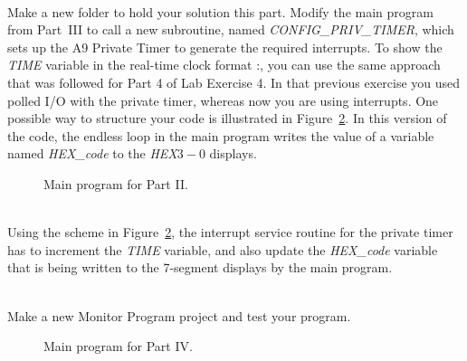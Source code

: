 \documentclass[epsfig,10pt,fullpage]{article}
\newcommand{\CommonDocsPath}{../../../../common/docs}
\begin{document}
~\\
\noindent
Make a new folder to hold your solution this part. Modify the main
program from Part~III to call a new subroutine, named {\it CONFIG\_PRIV\_TIMER}, which sets up the
A9 Private Timer to generate the required interrupts. To show the {\it TIME} variable in
the real-time clock format :, you can use the same approach that was
followed for Part 4 of Lab Exercise 4. In that previous exercise you used polled I/O with
the private timer, whereas now you are using interrupts. One possible way to structure
your code is illustrated in Figure~\ref{fig:code3}. In this version of the code, the 
endless loop in the main program writes the value of a variable named {\it HEX\_code} to 
the {\it HEX}$3-0$ displays. 

\begin{figure}[H]
\begin{center}

\end{center}
\caption{Main program for Part II.}
\label{fig:code2}
\end{figure}

~\\
\noindent
Using the scheme in Figure~\ref{fig:code3}, the interrupt service routine for the private 
timer has to increment the {\it TIME} variable, and also update
the {\it HEX\_code} variable that is being written to the 7-segment displays by the main program.

~\\
\noindent
Make a new Monitor Program project and test your program. 

\begin{figure}[H]
\begin{center}

\end{center}
\vspace{-0.5cm}\caption{Main program for Part IV.}
\label{fig:code3}
\end{figure}



\end{document}
